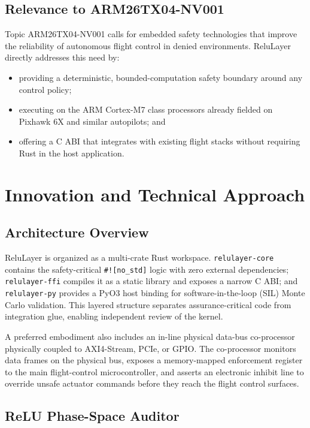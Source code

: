 \documentclass[11pt,oneside]{article}
\begin{document}
\subsection{Relevance to ARM26TX04-NV001}

Topic ARM26TX04-NV001 calls for embedded safety technologies that improve the reliability of autonomous flight control in denied environments. ReluLayer directly addresses this need by:
\begin{itemize}[nosep]
    \item providing a deterministic, bounded-computation safety boundary around any control policy;
    \item executing on the ARM Cortex-M7 class processors already fielded on Pixhawk 6X and similar autopilots; and
    \item offering a C ABI that integrates with existing flight stacks without requiring Rust in the host application.
\end{itemize}

\section{Innovation and Technical Approach}

\subsection{Architecture Overview}

ReluLayer is organized as a multi-crate Rust workspace. \texttt{relulayer-core} contains the safety-critical \texttt{\#![no\_std]} logic with zero external dependencies; \texttt{relulayer-ffi} compiles it as a static library and exposes a narrow C ABI; and \texttt{relulayer-py} provides a PyO3 host binding for software-in-the-loop (SIL) Monte Carlo validation. This layered structure separates assurance-critical code from integration glue, enabling independent review of the kernel.

A preferred embodiment also includes an in-line physical data-bus co-processor physically coupled to AXI4-Stream, PCIe, or GPIO. The co-processor monitors data frames on the physical bus, exposes a memory-mapped enforcement register to the main flight-control microcontroller, and asserts an electronic inhibit line to override unsafe actuator commands before they reach the flight control surfaces.

\subsection{ReLU Phase-Space Auditor}
\end{document}
